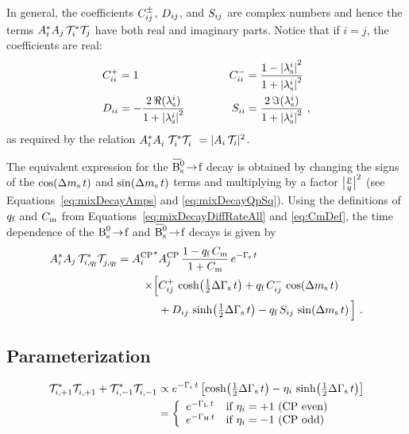 In general, the coefficients $\Cf[ij]^\pm$, $\Df[ij]$, and $\Sf[ij]$ are complex numbers and hence the terms
$\Ai^*\Ai[j]\,\timeAmp^*\timeAmp[j]$ have both real and imaginary parts. Notice that if $i=j$, the coefficients are real:
\begin{equation}
  \begin{alignedat}{2}
    \Cf[ii]^+ &= 1                                                    &  \Cf[ii]^- &= \frac{1-\lamsiSq}{1+\lamsiSq} \\
    \Df[ii]   &= -\frac{2\,\Re(\lamsi)}{1+\lamsiSq} \qquad\qquad  &  \Sf[ii]   &= \frac{2\,\Im(\lamsi)}{1+\lamsiSq} \ ,
  \end{alignedat}
\end{equation}
as required by the relation $\Ai^*\Ai^{\phantom{*}}\,\timeAmp^*\timeAmp^{\phantom{*}} = |\Ai\,\timeAmp|^2$.

The equivalent expression for the $\Bsbartof$ decay is obtained by changing the signs of the $\cDms$ and $\sDms$ terms and multiplying
by a factor $\pqAbsAlt^\text{2}$ (see Equations~\ref{eq:mixDecayAmps} and \ref{eq:mixDecayQpSq}). Using the definitions of $\qf$ and
$\Cm$ from Equations~\ref{eq:mixDecayDiffRateAll} and \ref{eq:CmDef}, the time dependence of the $\Bstof$ and $\Bsbartof$ decays is
given by
\begin{equation}
  \label{eq:timeqfDep}
  \begin{aligned}
    \Ai^*\Ai[j]\,\timeAmp[i,\qf]^*\timeAmp[j,\qf]^{\phantom{*}} =
      \magAvConj&\magAv[{\Ai[j]}]\, \frac{1-\qf\,\Cm}{1+\Cm}\, \eGst \\
          \times\Big[ &\Cf[ij]^+\,\cDGs + \qf\,\Cf[ij]^-\,\cDms \\
                      &+ \Df[ij]\,\sDGs - \qf\,\Sf[ij]\,\sDms \Big] \ .
  \end{aligned}
\end{equation}


\subsection{Parameterization}
\label{subsec:pheno_time_param}


\begin{equation}
  \begin{aligned}
    \label{eq:timeCPEvenOdd}
    \timeAmp[i,+1]^*\timeAmp[i,+1]^{\phantom{*}} + \timeAmp[i,-1]^*\timeAmp[i,-1]^{\phantom{*}}
      &\propto \eGst\left[ \cDGs - \eta_i\,\sDGs \right]  \\
      &= \left\{\begin{array}{ll}
                  e^{-\GL\,t}  &  \text{if } \eta_i = +1 \text{ (CP even)}  \\
                  e^{-\GH\,t}  &  \text{if } \eta_i = -1 \text{ (CP odd)}
         \end{array}\right.
  \end{aligned}
\end{equation}

